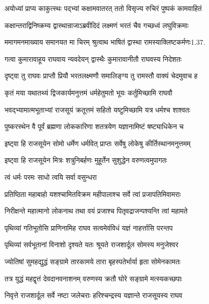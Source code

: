 \twolineshloka
{अयोध्यां प्राप्य काकुत्स्थः पद्भ्यां कक्षामवातरत्}
{ततो विसृज्य रुचिरं पुष्पकं कामवाहितं}%

\twolineshloka
{कक्षान्तराद्विनिष्क्रम्य द्वास्थान्राजाऽब्रवीदिदं}
{लक्ष्मणं भरतं चैव गच्छध्वं लघुविक्रमाः}%

\twolineshloka
{ममागमनमाख्याय समानयत मा चिरम्}
{श्रुत्वाथ भाषितं द्वास्था रामस्याक्लिष्टकर्मणः1.37.}%

\twolineshloka
{गत्वा कुमारावाहूय राघवाय न्यवदेयन्}
{द्वास्थैः कुमारावानीतौ राघवस्य निदेशतः}%

\twolineshloka
{दृष्ट्वा तु राघवः प्राप्तौ प्रियौ भरतलक्ष्मणौ}
{समालिङ्ग्य तु रामस्तौ वाक्यं चेदमुवाच ह}%

\twolineshloka
{कृतं मया यथातथ्यं द्विजकार्यमनुत्तमं}
{धर्महेतुमतो भूयः कर्तुमिच्छामि राघवौ}%

\twolineshloka
{भवद्भ्यामात्मभूताभ्यां राजसूयं क्रतूत्तमं}
{सहितो यष्टुमिच्छामि यत्र धर्मश्च शाश्वतः}%

\twolineshloka
{पुष्करस्थेन वै पूर्वं ब्रह्मणा लोककारिणा}
{शतत्रयेण यज्ञानामिष्टं षष्ट्याधिकेन च}%

\twolineshloka
{इष्ट्वा हि राजसूयेन सोमो धर्मेण धर्मवित्}
{प्राप्तः सर्वेषु लोकेषु कीर्तिस्थानमनुत्तमम्}%

\twolineshloka
{इष्ट्वा हि राजसूयेन मित्रः शत्रुनिबर्हणः}
{मुहूर्तेन सुशुद्धेन वरुणत्वमुपागतः}%



\onelineshloka
{त्वं धर्मः परमः साधो त्वयि सर्वा वसुन्धरा}%

\twolineshloka
{प्रतिष्ठिता महाबाहो यशश्चामितविक्रम}
{महीपालाश्च सर्वे त्वां प्रजापतिमिवामराः}%

\twolineshloka
{निरीक्षन्ते महात्मानो लोकनाथ तथा वयं}
{प्रजाश्च पितृवद्राजन्पश्यन्ति त्वां महामते}%

\twolineshloka
{पृथिव्यां गतिभूतोसि प्राणिनामिह राघव}
{सत्वमेवंविधं यज्ञं नाहर्त्तासि परन्तप}%

\twolineshloka
{पृथिव्यां सर्वभूतानां विनाशो दृश्यते यतः}
{श्रूयते राजशार्दूल सोमस्य मनुजेश्वर}%

\twolineshloka
{ज्योतिषां सुमहद्युद्धं सङ्ग्रामे तारकामये}
{तारा बृहस्पतेर्भार्या हृता सोमेनकामतः}%

\twolineshloka
{तत्र युद्धं महद्वृत्तं देवदानवनाशनम्}
{वरुणस्य क्रतौ घोरे सङ्ग्रामे मत्स्यकच्छपाः}%

\twolineshloka
{निवृत्ते राजशार्दूल सर्वे नष्टा जलेचराः}
{हरिश्चन्द्रस्य यज्ञान्ते राजसूयस्य राघव}%

